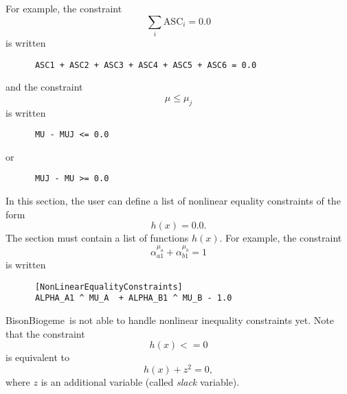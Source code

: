 \documentclass[12pt,a4paper]{article}
\newcommand{\specitem}[1]{\texttt{[#1]}}
\newcommand{\BBIOGEME}{BisonBiogeme}
\begin{document}
\begin{description}
      For example, the constraint
      \[
      \sum_i \text{ASC}_i = 0.0
      \]
      is written
      \begin{verbatim}
      ASC1 + ASC2 + ASC3 + ASC4 + ASC5 + ASC6 = 0.0
      \end{verbatim}
      and the constraint
      \[
      \mu \leq \mu_j
      \]
      is written 
      \begin{verbatim}
      MU - MUJ <= 0.0
      \end{verbatim}
      or
      \begin{verbatim}
      MUJ - MU >= 0.0
      \end{verbatim}

   \item[\specitem{NonLinearEqualityConstraints}]
      In this section, the user can define a list of nonlinear equality constraints of the form 
      \[
      h(x) = 0.0.
      \]
      The section must contain a list of functions $h(x)$. For example, the constraint
      \[
      \alpha_{a1}^{\mu_a} + \alpha_{b1}^{\mu_b} = 1
      \]
      is written
      \begin{verbatim}
      [NonLinearEqualityConstraints]
      ALPHA_A1 ^ MU_A  + ALPHA_B1 ^ MU_B - 1.0
      \end{verbatim}

   \item[\specitem{NonLinearInequalityConstraints}] 
      \BBIOGEME\ is not able to handle nonlinear inequality
      constraints yet. Note that the constraint 
\[ 
h(x) <= 0
\]
is equivalent to 
\[
h(x) + z^2 = 0,
\]
where $z$ is an additional variable (called \emph{slack} variable).



\end{description}
\end{document}
